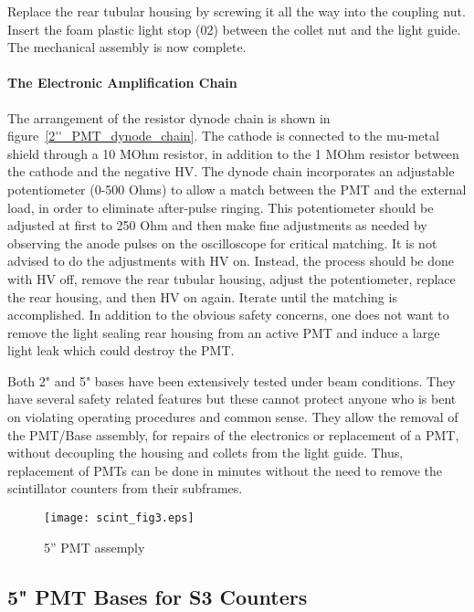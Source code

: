 \documentclass[12pt]{article}
\begin{document}
Replace the rear tubular housing by screwing it all the way into the coupling 
nut. Insert the foam plastic light stop (02) between the collet nut and the 
light guide. The mechanical assembly is now complete. 


\paragraph{The Electronic Amplification Chain}

   The arrangement of the resistor dynode chain is shown in figure~\ref{2''_PMT_dynode_chain}. The 
cathode is connected to the mu-metal shield through a 10 MOhm resistor, in
addition to the 1 MOhm resistor between the cathode and the negative HV. The
dynode chain incorporates an adjustable potentiometer (0-500 Ohms) to allow a
match between the PMT and the external load, in order to eliminate after-pulse
ringing.  This potentiometer should be adjusted at first to 250 Ohm and then
make fine adjustments as needed by observing the anode pulses on the
oscilloscope for critical matching. It is not advised to do the adjustments
with HV on. Instead, the process should be done with HV off, remove the rear
tubular housing, adjust the potentiometer, replace the rear housing, and then
HV on again. Iterate until the matching is accomplished. In addition to the
obvious safety concerns, one does not want to remove the light sealing rear
housing from an active PMT and induce a large light leak which could destroy
the PMT. 

   Both 2" and 5" bases have been extensively tested under beam conditions. 
They have several safety related features but these cannot protect anyone who 
is bent on violating operating procedures and common sense. They allow the 
removal of the PMT/Base assembly, for repairs of the electronics or replacement 
of a PMT, without decoupling the housing and collets from the light guide. 
Thus, replacement of PMTs can be done in minutes without the need to remove the 
scintillator counters from their subframes.

\begin{figure}
\begin{center}
\texttt{[image: scint\_fig3.eps]}
{\linespread{1.}
\caption[The S3 trigger scintillators]{5'' PMT assemply}
\label{5''_PMT_assembly}}
\end{center}
\end{figure}

\subsection{ 5" PMT Bases for S3 Counters}
\end{document}
